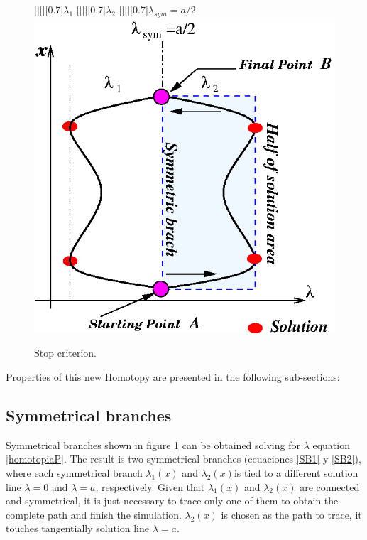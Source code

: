 \documentclass[conference,letterpaper,twocolumn]{IEEEtran}
\begin{document}
\begin{figure}[hbtp]
[][][0.7]{$\lambda_1$}
[][][0.7]{$\lambda_2$}
[][][0.7]{$\lambda_{sym}=a/2$}
\centering
\includegraphics[scale=0.55]{fig/dbh2.eps}
\caption{Stop criterion.}
\label{halftrack}
\end{figure}

Properties of this new Homotopy are presented in the following sub-sections:

\subsection{Symmetrical branches}

Symmetrical branches shown in figure \ref{halftrack} can be obtained solving for $\lambda$ equation \ref{homotopiaP}. The result is two symmetrical branches (ecuaciones \ref{SB1} y \ref{SB2}), where each symmetrical branch $\lambda_1(x)$ and $\lambda_2(x)$is tied to a different solution line $\lambda=0$ and $\lambda=a$, respectively. Given that $\lambda_1(x)$ and $\lambda_2(x)$ are connected and symmetrical, it is just necessary to trace only one of them to obtain the complete path and finish the simulation. $\lambda_2(x)$ is chosen as the path to trace, it touches tangentially solution line $\lambda=a$.
\end{document}
